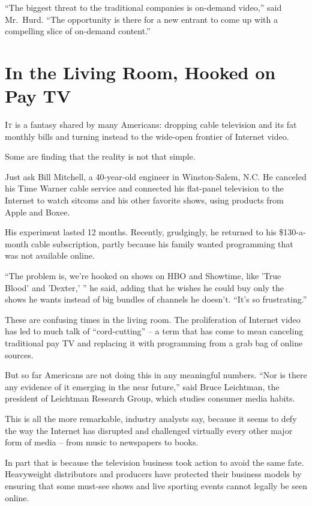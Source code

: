 ﻿\documentclass[12pt]{article}
\begin{document}
``The biggest threat to the traditional companies is on-demand video,'' said Mr.~Hurd. ``The
opportunity is there for a new entrant to come up with a compelling slice of on-demand content.''

\pagebreak
\section{In the Living Room, Hooked on Pay TV}

\lettrine{I}{t} is a fantasy shared by many Americans: dropping cable
television and its fat monthly bills and turning instead to the wide-open frontier of Internet
video.

Some are finding that the reality is not that simple.

Just ask Bill Mitchell, a 40-year-old engineer in Winston-Salem, N.C. He canceled his Time Warner
cable service and connected his flat-panel television to the Internet to watch sitcoms and his other
favorite shows, using products from Apple and Boxee.

His experiment lasted 12 months. Recently, grudgingly, he returned to his \$130-a-month cable
subscription, partly because his family wanted programming that was not available online.

``The problem is, we're hooked on shows on HBO and Showtime, like 'True Blood' and 'Dexter,' '' he
said, adding that he wishes he could buy only the shows he wants instead of big bundles of channels
he doesn't. ``It's so frustrating.''

These are confusing times in the living room. The proliferation of Internet video has led to much
talk of ``cord-cutting'' -- a term that has come to mean canceling traditional pay TV and replacing
it with programming from a grab bag of online sources.

But so far Americans are not doing this in any meaningful numbers. ``Nor is there any evidence of it
emerging in the near future,'' said Bruce Leichtman, the president of Leichtman Research Group,
which studies consumer media habits.

This is all the more remarkable, industry analysts say, because it seems to defy the way the
Internet has disrupted and challenged virtually every other major form of media -- from music to
newspapers to books.

In part that is because the television business took action to avoid the same fate. Heavyweight
distributors and producers have protected their business models by ensuring that some must-see shows
and live sporting events cannot legally be seen online.
\end{document}
